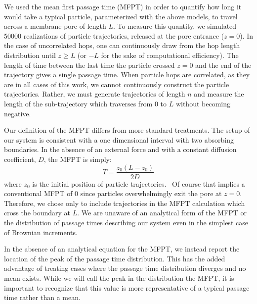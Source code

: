 \documentclass{article}
\begin{document}
  We used the mean first passage time (MFPT) in order to quantify how long it would take a 
  typical particle, parameterized with the above models, to travel across a membrane pore
  of length $L$. To measure this quantity, we simulated 50000 realizations of particle 
  trajectories, released at the pore entrance ($z=0$). In the case of uncorrelated hops, one
  can continuously draw from the hop length distribution until $z \geq L$ (or $-L$ for 
  the sake of computational efficiency). The length of time between the last time the 
  particle crossed $z=0$ and the end of the trajectory gives a single passage time. 
  When particle hops are correlated, as they are in all cases of this work, we cannot 
  continuously construct the particle trajectories. Rather, we must generate trajectories
  of length $n$ and measure the length of the sub-trajectory which traverses from $0$ 
  to $L$ without becoming negative.
  
  Our definition of the MFPT differs from more standard treatments. The setup of our 
  system is consistent with a one dimensional interval with two absorbing boundaries. In
  the absence of an external force and with a constant diffusion coefficient,
  $D$, the MFPT is simply:
  \begin{equation}
  T = \frac{z_0(L - z_0)}{2D}
  \end{equation}
  where $z_0$ is the initial position of particle trajectories.~\cite{gitterman_mean_2000}
  Of course that implies a conventional MFPT of 0 since particles overwhelmingly exit the
  pore at $z=0$. Therefore, we chose only to include trajectories in the MFPT calculation 
  which cross the boundary at $L$. We are unaware of an analytical form of the MFPT or 
  the distribution of passage times describing our system even in the simplest case of 
  Brownian increments. %
  
  In the absence of an analytical equation for the MFPT, we instead report the location of
  the peak of the passage time distribution. This has the added advantage of treating
  cases where the passage time distribution diverges and no mean exists. While we will
  call the peak in the distribution the MFPT, it is important to recognize that this 
  value is more representative of a typical passage time rather than a mean. 
\end{document}
